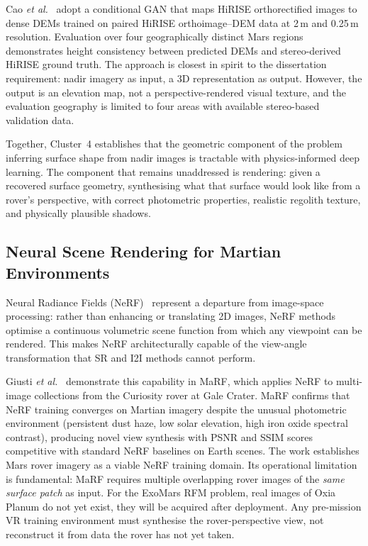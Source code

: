 \documentclass[10pt,journal]{IEEEtran}
\begin{document}
Cao \textit{et al.}~\cite{cao2024gen3d} adopt a conditional GAN that maps
HiRISE orthorectified images to dense DEMs trained on paired HiRISE
orthoimage--DEM data at 2\,m and 0.25\,m resolution. Evaluation over four
geographically distinct Mars regions demonstrates height consistency between
predicted DEMs and stereo-derived HiRISE ground truth. The approach is closest
in spirit to the dissertation requirement: nadir imagery as input, a 3D
representation as output. However, the output is an elevation map, not a
perspective-rendered visual texture, and the evaluation geography is limited to
four areas with available stereo-based validation data.

Together, Cluster~4 establishes that the geometric component of the problem 
inferring surface shape from nadir images is tractable with physics-informed
deep learning. The component that remains unaddressed is rendering: given a
recovered surface geometry, synthesising what that surface would look like from
a rover's perspective, with correct photometric properties, realistic regolith
texture, and physically plausible shadows.

\subsection{Neural Scene Rendering for Martian Environments}
\label{subsec:nerf}

Neural Radiance Fields (NeRF)~\cite{paul2025nerfspace} represent a departure
from image-space processing: rather than enhancing or translating 2D images, NeRF
methods optimise a continuous volumetric scene function from which any viewpoint
can be rendered. This makes NeRF architecturally capable of the view-angle
transformation that SR and I2I methods cannot perform.

Giusti \textit{et al.}~\cite{giusti2022marf} demonstrate this capability in
MaRF, which applies NeRF to multi-image collections from the Curiosity rover at
Gale Crater. MaRF confirms that NeRF training converges on Martian imagery
despite the unusual photometric environment (persistent dust haze, low solar
elevation, high iron oxide spectral contrast), producing novel view synthesis
with PSNR and SSIM scores competitive with standard NeRF baselines on Earth
scenes. The work establishes Mars rover imagery as a viable NeRF training
domain. Its operational limitation is fundamental: MaRF requires multiple
overlapping rover images of the \textit{same surface patch} as input. For the
ExoMars RFM problem, real images of Oxia Planum do not yet exist, they will be
acquired after deployment. Any pre-mission VR training environment must
synthesise the rover-perspective view, not reconstruct it from data the rover
has not yet taken.
\end{document}
